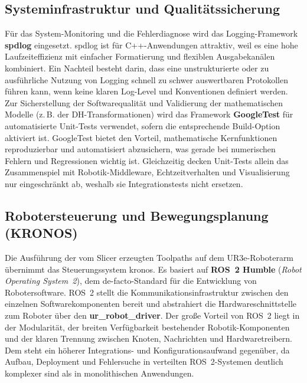         \subsection{Systeminfrastruktur und Qualitätssicherung}
        Für das System-Monitoring und die Fehlerdiagnose wird das Logging-Framework \textbf{spdlog} eingesetzt.
        spdlog ist für C++-Anwendungen attraktiv,
        weil es eine hohe Laufzeiteffizienz mit einfacher Formatierung und flexiblen Ausgabekanälen kombiniert.
        Ein Nachteil besteht darin,
        dass eine unstrukturierte oder zu ausführliche Nutzung von Logging schnell zu schwer auswertbaren Protokollen führen kann,
        wenn keine klaren Log-Level und Konventionen definiert werden.
        Zur Sicherstellung der Softwarequalität und Validierung der mathematischen Modelle (z.\,B. der \ac{DH}-Transformationen) wird das Framework \textbf{GoogleTest}
        für automatisierte Unit-Tests verwendet, sofern die entsprechende Build-Option aktiviert ist.
        GoogleTest bietet den Vorteil,
        mathematische Kernfunktionen reproduzierbar und automatisiert abzusichern,
        was gerade bei numerischen Fehlern und Regressionen wichtig ist.
        Gleichzeitig decken Unit-Tests allein das Zusammenspiel mit Robotik-Middleware,
        Echtzeitverhalten und Visualisierung nur eingeschränkt ab,
        weshalb sie Integrationstests nicht ersetzen.

        \subsection{Robotersteuerung und Bewegungsplanung (KRONOS)}\label{subsec:software-stack-kronos}
        Die Ausführung der vom Slicer erzeugten Toolpaths auf dem UR3e-Roboterarm übernimmt das Steuerungssystem \ac{kronos}.
        Es basiert auf \textbf{\ac{ROS}~2 Humble} (\textit{Robot Operating System~2}), dem de-facto-Standard für die Entwicklung von Robotersoftware.
        \ac{ROS}~2 stellt die Kommunikationsinfrastruktur zwischen den einzelnen Softwarekomponenten bereit und abstrahiert die Hardwareschnittstelle
        zum Roboter über den \textbf{ur\_robot\_driver}.
        Der große Vorteil von \ac{ROS}~2 liegt in der Modularität,
        der breiten Verfügbarkeit bestehender Robotik-Komponenten und der klaren Trennung zwischen Knoten,
        Nachrichten und Hardwaretreibern.
        Dem steht ein höherer Integrations- und Konfigurationsaufwand gegenüber,
        da Aufbau, Deployment und Fehlersuche in verteilten \ac{ROS}~2-Systemen deutlich komplexer sind als in monolithischen Anwendungen.

